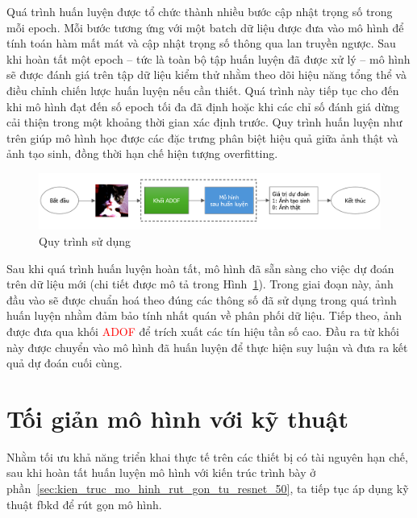 Quá trình huấn luyện được tổ chức thành nhiều bước cập nhật trọng số trong mỗi \gls{epoch}. Mỗi bước tương ứng với một \gls{batch} dữ liệu được đưa vào mô hình để tính toán hàm mất mát và cập nhật trọng số thông qua lan truyền ngược. Sau khi hoàn tất một \gls{epoch} – tức là toàn bộ tập huấn luyện đã được xử lý – mô hình sẽ được đánh giá trên tập dữ liệu kiểm thử nhằm theo dõi hiệu năng tổng thể và điều chỉnh chiến lược huấn luyện nếu cần thiết. Quá trình này tiếp tục cho đến khi mô hình đạt đến số \gls{epoch} tối đa đã định hoặc khi các chỉ số đánh giá dừng cải thiện trong một khoảng thời gian xác định trước. Quy trình huấn luyện như trên giúp mô hình học được các đặc trưng phân biệt hiệu quả giữa ảnh thật và ảnh tạo sinh, đồng thời hạn chế hiện tượng \gls{overfitting}.
%
%
\begin{figure}[ht!]
	\centering
	\includegraphics[width=1.0\linewidth]{Images/online-serving.png}
	\begin{minipage}{1.0\linewidth}
		\vspace{3mm}
		\caption{Quy trình sử dụng}
		\label{fig:online-serving}
	\end{minipage}
\end{figure}
%
%

Sau khi quá trình huấn luyện hoàn tất, mô hình đã sẵn sàng cho việc dự đoán trên dữ liệu mới (chi tiết được mô tả trong Hình~\ref{fig:online-serving}). Trong giai đoạn này, ảnh đầu vào sẽ được chuẩn hoá theo đúng các thông số đã sử dụng trong quá trình huấn luyện nhằm đảm bảo tính nhất quán về phân phối dữ liệu. Tiếp theo, ảnh được đưa qua khối \textcolor{red}{ADOF} để trích xuất các tín hiệu tần số cao. Đầu ra từ khối này được chuyển vào mô hình đã huấn luyện để thực hiện suy luận và đưa ra kết quả dự đoán cuối cùng.

\section{Tối giản mô hình với kỹ thuật }
%
\label{ss:toi_gian_mo_hinh}
%
Nhằm tối ưu khả năng triển khai thực tế trên các thiết bị có tài nguyên hạn chế, sau khi hoàn tất huấn luyện mô hình với kiến trúc trình bày ở phần~\ref{sec:kien_truc_mo_hinh_rut_gon_tu_resnet_50}, ta tiếp tục áp dụng kỹ thuật \gls{fbkd} để rút gọn mô hình.

